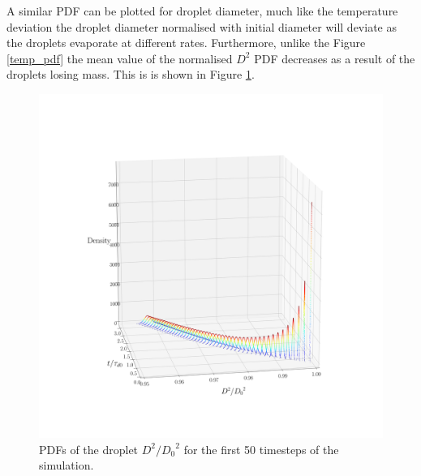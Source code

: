 \documentclass[../Interim_Report_Master]{subfiles}
\begin{document}
A similar PDF can be plotted for droplet diameter, much like the temperature deviation the droplet diameter normalised with initial diameter will deviate as the droplets evaporate at different rates. Furthermore, unlike the Figure \ref{temp_pdf} the mean value of the normalised $D^2$ PDF decreases as a result of the droplets losing mass. This is is shown in Figure \ref{diameter_pdf}. 
\begin{figure}[H]
	\centering %
	\includegraphics[width=\textwidth, trim={0.8in 2in 0.5in 4in}, clip]{./Diagrams/Mass_PDFs.png}
	\caption{PDFs of the droplet $D^2/{D_0}^2$ for the first 50 timesteps of the simulation.}
	\label{diameter_pdf}
\end{figure}
\end{document}
